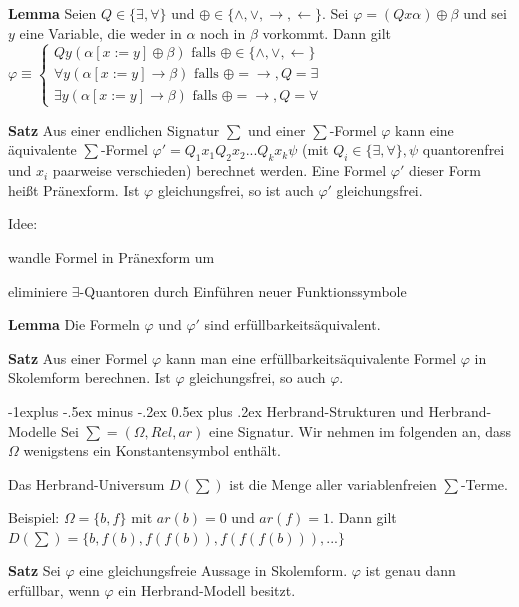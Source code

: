 \documentclass[a4paper]{article}
\makeatletter
\renewcommand{\note}[2]{\begin{noteBox} \textbf{#1} #2 \end{noteBox}}
\renewcommand{\subsection}{\@startsection{subsection}{2}{0mm}%
                {-1explus -.5ex minus -.2ex}%
                {0.5ex plus .2ex}%
                {\normalfont\normalsize\bfseries}}
\makeatother
\begin{document}
\begin{multicols}{3}
  \note{Lemma}{Seien $Q\in\{\exists,\forall\}$ und $\oplus\in\{\wedge,\vee,\rightarrow,\leftarrow\}$. Sei $\varphi= (Qx\alpha)\oplus\beta$ und sei $y$ eine Variable, die weder in $\alpha$ noch in $\beta$ vorkommt. Dann gilt $\varphi\equiv\begin{cases} Qy(\alpha[x:=y]\oplus\beta) \text{ falls }\oplus\in\{\wedge,\vee,\leftarrow\} \\ \forall y(\alpha[x:=y]\rightarrow\beta) \text{ falls }\oplus=\rightarrow,Q=\exists \\ \exists y(\alpha[x:=y]\rightarrow\beta) \text{ falls }\oplus=\rightarrow,Q=\forall \end{cases}$}

  \note{Satz}{Aus einer endlichen Signatur $\sum$ und einer $\sum$-Formel $\varphi$ kann eine äquivalente $\sum$-Formel $\varphi'=Q_1 x_1 Q_2 x_2 ...Q_k x_k \psi$ (mit $Q_i\in\{\exists,\forall\},\psi$ quantorenfrei und $x_i$ paarweise verschieden) berechnet werden. Eine Formel $\varphi'$ dieser Form heißt Pränexform. Ist $\varphi$ gleichungsfrei, so ist auch $\varphi'$ gleichungsfrei.}

  Idee:
  \begin{enumerate*}
    \item wandle Formel in Pränexform um
    \item eliminiere $\exists$-Quantoren durch Einführen neuer Funktionssymbole
  \end{enumerate*}

  \note{Lemma}{Die Formeln $\varphi$ und $\varphi'$ sind erfüllbarkeitsäquivalent.}

  \note{Satz}{Aus einer Formel $\varphi$ kann man eine erfüllbarkeitsäquivalente Formel $\varphi$ in Skolemform berechnen. Ist $\varphi$ gleichungsfrei, so auch $\varphi$.}

  \subsection{Herbrand-Strukturen und Herbrand-Modelle}
  Sei $\sum= (\Omega,Rel,ar)$ eine Signatur. Wir nehmen im folgenden an, dass $\Omega$ wenigstens ein Konstantensymbol enthält.

  Das Herbrand-Universum $D(\sum)$ ist die Menge aller variablenfreien $\sum$-Terme.

  Beispiel: $\Omega =\{b,f\}$ mit $ar(b) =0$ und $ar(f) =1$. Dann gilt $D(\sum) =\{b,f(b),f(f(b)),f(f(f(b))),...\}$

  \note{Satz}{Sei $\varphi$ eine gleichungsfreie Aussage in Skolemform. $\varphi$ ist genau dann erfüllbar, wenn $\varphi$ ein Herbrand-Modell besitzt.}


\end{multicols}
\end{document}
